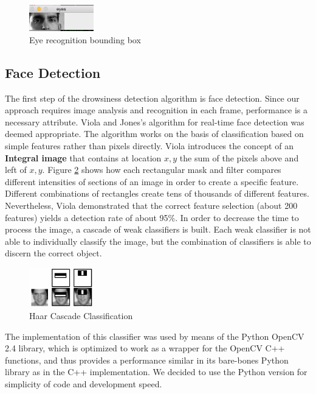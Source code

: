\documentclass[twocolumn]{article}
\begin{document}
\begin{figure}
\centering
\includegraphics[width=0.25\textwidth]{./eyes.png}
\caption{Eye recognition bounding box }
\label{fig:eyes}
\end{figure}


\subsection{Face Detection}
The first step of the drowsiness detection algorithm is face detection. Since our approach requires image analysis and recognition in each frame, performance is a necessary attribute. Viola and Jones's \cite{viola} algorithm for real-time face detection was deemed appropriate. The algorithm works on the basis of classification based on simple features rather than pixels directly. Viola introduces the concept of an \textbf{Integral image} that contains at location $x,y$ the sum of the pixels above and left of $x,y$. Figure \ref{fig:haar} shows how each rectangular mask and filter compares different intensities of sections of an image in order to create a specific feature. Different combinations of rectangles create tens of thousands of different features. Nevertheless, Viola demonstrated that the correct feature selection (about 200 features) yields a detection rate of about 95\%. In order to decrease the time to process the image, a cascade of weak classifiers is built. Each weak classifier is not able to individually classify the image, but the combination of classifiers is able to discern the correct object. 
\\
\begin{figure}[H]
\centering
\includegraphics[width=0.25\textwidth]{./haar.png}
\caption{Haar Cascade Classification}
\label{fig:haar}
\end{figure}

The implementation of this classifier was used by means of the Python OpenCV 2.4 library, which is optimized to work as a wrapper for the OpenCV C++ functions, and thus provides a performance similar in its bare-bones Python library as in the C++ implementation. We decided to use the Python version for simplicity of code and development speed. 
\end{document}
